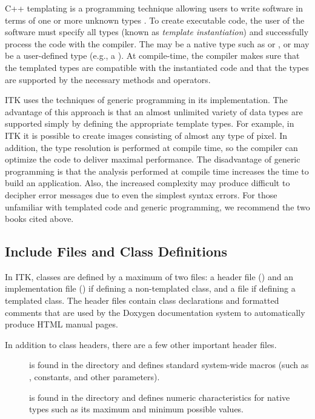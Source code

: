 C++ templating is a programming technique allowing users to write software in
terms of one or more unknown types . To create executable code, the
user of the software must specify all types  (known as \emph{template
instantiation}) and successfully process the code with the compiler. The
 may be a native type such as
 or , or  may be a user-defined type (e.g.,
a ). At compile-time, the compiler makes sure that the templated
types are compatible with the instantiated code and that the types are
supported by the necessary methods and operators.

ITK uses the techniques of generic programming in its implementation. The
advantage of this approach is that an almost unlimited variety of data types
are supported simply by defining the appropriate template types. For example,
in ITK it is possible to create images consisting of almost any type of
pixel. In addition, the type resolution is performed at compile time, so the
compiler can optimize the code to deliver maximal performance. The
disadvantage of generic programming is that the analysis performed at compile
time increases the time to build an application. Also, the increased
complexity may produce difficult to decipher error messages due to even the
simplest syntax errors. For those unfamiliar with templated code and
generic programming, we recommend the two books cited above.

\subsection{Include Files and Class Definitions}%
\label{sec:IncludeFiles}

In ITK, classes are defined by a maximum of two files: a header file ()
and an implementation file () if defining a non-templated class, and a
 file if defining a templated class.
The header files contain class declarations
and formatted comments that are used by the Doxygen documentation
system to automatically produce HTML manual pages.

In addition to class headers, there are a few other important header files.
\begin{description}
    \item[] is found in the
     directory
    and defines standard system-wide macros (such as ,
    constants, and other parameters).

    \item[] is found in the
     directory and defines numeric
    characteristics for native types such as its maximum and minimum
    possible values.
\end{description}

